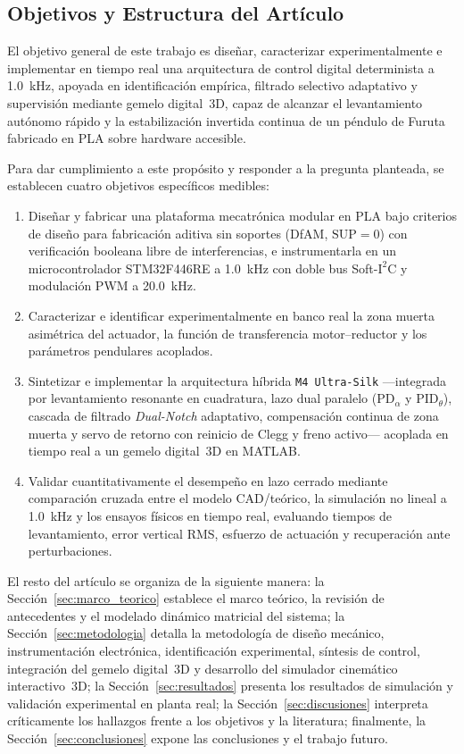 \subsection{Objetivos y Estructura del Artículo}
El objetivo general de este trabajo es diseñar, caracterizar experimentalmente e implementar en tiempo real una arquitectura de control digital determinista a \qty{1.0}{\kilo\hertz}, apoyada en identificación empírica, filtrado selectivo adaptativo y supervisión mediante gemelo digital~3D, capaz de alcanzar el levantamiento autónomo rápido y la estabilización invertida continua de un péndulo de Furuta fabricado en PLA sobre hardware accesible.

Para dar cumplimiento a este propósito y responder a la pregunta planteada, se establecen cuatro objetivos específicos medibles:
\begin{enumerate}
    \item Diseñar y fabricar una plataforma mecatrónica modular en PLA bajo criterios de diseño para fabricación aditiva sin soportes (DfAM, $\text{SUP}=0$) con verificación booleana libre de interferencias, e instrumentarla en un microcontrolador STM32F446RE a \qty{1.0}{\kilo\hertz} con doble bus Soft-$\text{I}^2\text{C}$ y modulación PWM a \qty{20.0}{\kilo\hertz}.
    \item Caracterizar e identificar experimentalmente en banco real la zona muerta asimétrica del actuador, la función de transferencia motor--reductor y los parámetros pendulares acoplados.
    \item Sintetizar e implementar la arquitectura híbrida \texttt{M4 Ultra-Silk} ---integrada por levantamiento resonante en cuadratura, lazo dual paralelo ($\text{PD}_\alpha$ y $\text{PID}_\theta$), cascada de filtrado \textit{Dual-Notch} adaptativo, compensación continua de zona muerta y servo de retorno con reinicio de Clegg y freno activo--- acoplada en tiempo real a un gemelo digital~3D en MATLAB.
    \item Validar cuantitativamente el desempeño en lazo cerrado mediante comparación cruzada entre el modelo CAD/teórico, la simulación no lineal a \qty{1.0}{\kilo\hertz} y los ensayos físicos en tiempo real, evaluando tiempos de levantamiento, error vertical RMS, esfuerzo de actuación y recuperación ante perturbaciones.
\end{enumerate}

El resto del artículo se organiza de la siguiente manera: la Sección~\ref{sec:marco_teorico} establece el marco teórico, la revisión de antecedentes y el modelado dinámico matricial del sistema; la Sección~\ref{sec:metodologia} detalla la metodología de diseño mecánico, instrumentación electrónica, identificación experimental, síntesis de control, integración del gemelo digital~3D y desarrollo del simulador cinemático interactivo~3D; la Sección~\ref{sec:resultados} presenta los resultados de simulación y validación experimental en planta real; la Sección~\ref{sec:discusiones} interpreta críticamente los hallazgos frente a los objetivos y la literatura; finalmente, la Sección~\ref{sec:conclusiones} expone las conclusiones y el trabajo futuro.

